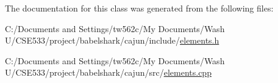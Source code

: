The documentation for this class was generated from the following files:\begin{CompactItemize}
\item 
C:/Documents and Settings/tw562c/My Documents/Wash U/CSE533/project/babelshark/cajun/include/\hyperlink{elements_8h}{elements.h}\item 
C:/Documents and Settings/tw562c/My Documents/Wash U/CSE533/project/babelshark/cajun/src/\hyperlink{elements_8cpp}{elements.cpp}\end{CompactItemize}
